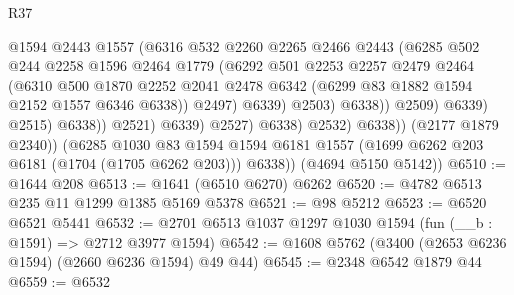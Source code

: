 \begin{lexlean}{R37}
\begin{coremodule}
                                      @1594
                                      @2443
                                      @1557
                                      (@6316
                                        @532
                                        @2260
                                        @2265
                                        @2466
                                        @2443
                                        (@6285
                                          @502
                                          @244
                                          @2258
                                          @1596
                                          @2464
                                          @1779
                                          (@6292
                                            @501
                                            @2253
                                            @2257
                                            @2479
                                            @2464
                                            (@6310
                                              @500
                                              @1870
                                              @2252
                                              @2041
                                              @2478
                                              @6342
                                              (@6299 @83 @1882 @1594 @2152 @1557 @6346 @6338))
                                            @2497)
                                          @6339)
                                        @2503)
                                      @6338))
                                  @2509)
                                @6339)
                              @2515)
                            @6338))
                        @2521)
                      @6339)
                    @2527)
                  @6338)
                @2532)
              @6338))
          (@2177 @1879 @2340))
        (@6285
          @1030
          @83
          @1594
          @1594
          @6181
          @1557
          (@1699 @6262 @203 @6181 (@1704 (@1705 @6262 @203)))
          @6338))
      (@4694 @5150 @5142))
@6510 := @1644 @208
@6513 := @1641 (@6510 @6270) @6262
@6520 := @4782 @6513 @235 @11 @1299 @1385 @5169 @5378
@6521 := @98 @5212
@6523 := @6520 @6521 @5441
@6532 := @2701 @6513 @1037 @1297 @1030 @1594 (fun (__b : @1591) => @2712 @3977 @1594)
@6542 := @1608 @5762 (@3400 (@2653 @6236 @1594) (@2660 @6236 @1594) @49 @44)
@6545 := @2348 @6542 @1879 @44
@6559 := @6532

\end{coremodule}
\end{lexlean}
